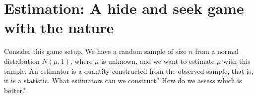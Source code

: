 \hypertarget{ch:estimation}{%
\chapter{Estimation: A hide and seek game with the nature}\label{ch:estimation}}

Consider this game setup. We have a random sample of size \(n\) from a normal
distribution \(N(\mu, 1)\), where \(\mu\) is unknown, and we want to estimate \(\mu\)
with this sample. An estimator is a quantity constructed from the observed
sample, that is, it is a statistic. What estimators can we construct? How do we
assess which is better?










